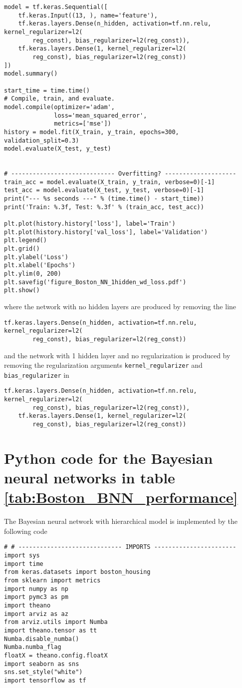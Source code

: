 \begin{appendices}
\begin{lstlisting}
model = tf.keras.Sequential([
    tf.keras.Input((13, ), name='feature'),
    tf.keras.layers.Dense(n_hidden, activation=tf.nn.relu, kernel_regularizer=l2(
        reg_const), bias_regularizer=l2(reg_const)),
    tf.keras.layers.Dense(1, kernel_regularizer=l2(
        reg_const), bias_regularizer=l2(reg_const))
])
model.summary()

start_time = time.time()
# Compile, train, and evaluate.
model.compile(optimizer='adam',
              loss='mean_squared_error',
              metrics=['mse'])
history = model.fit(X_train, y_train, epochs=300, validation_split=0.3)
model.evaluate(X_test, y_test)


# ----------------------------- Overfitting? --------------------
train_acc = model.evaluate(X_train, y_train, verbose=0)[-1]
test_acc = model.evaluate(X_test, y_test, verbose=0)[-1]
print("--- %s seconds ---" % (time.time() - start_time))
print('Train: %.3f, Test: %.3f' % (train_acc, test_acc))

plt.plot(history.history['loss'], label='Train')
plt.plot(history.history['val_loss'], label='Validation')
plt.legend()
plt.grid()
plt.ylabel('Loss')
plt.xlabel('Epochs')
plt.ylim(0, 200)
plt.savefig('figure_Boston_NN_1hidden_wd_loss.pdf')
plt.show()

\end{lstlisting}
where the network with no hidden layers are produced by removing the line \begin{lstlisting}
tf.keras.layers.Dense(n_hidden, activation=tf.nn.relu, kernel_regularizer=l2(
        reg_const), bias_regularizer=l2(reg_const))
\end{lstlisting}
and the network with 1 hidden layer and no regularization is produced by removing the regularization arguments \texttt{kernel\_regularizer} and \texttt{bias\_regularizer} in 
\begin{lstlisting}
tf.keras.layers.Dense(n_hidden, activation=tf.nn.relu, kernel_regularizer=l2(
        reg_const), bias_regularizer=l2(reg_const)),
    tf.keras.layers.Dense(1, kernel_regularizer=l2(
        reg_const), bias_regularizer=l2(reg_const))
\end{lstlisting}




\section{Python code for the Bayesian neural networks in table \ref{tab:Boston_BNN_performance}} \label{app:Boston_BNN}
The Bayesian neural network with hierarchical model is implemented by the following code
\begin{lstlisting}
# # ----------------------------- IMPORTS -----------------------
import sys
import time
from keras.datasets import boston_housing
from sklearn import metrics
import numpy as np 
import pymc3 as pm
import theano
import arviz as az
from arviz.utils import Numba
import theano.tensor as tt
Numba.disable_numba()
Numba.numba_flag
floatX = theano.config.floatX
import seaborn as sns
sns.set_style("white")
import tensorflow as tf



\end{lstlisting}
\end{appendices}

